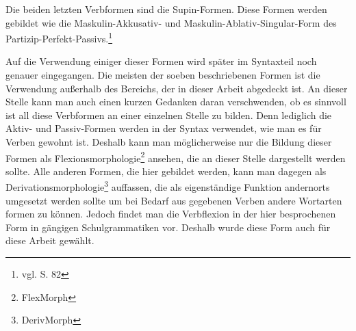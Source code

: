 \documentclass[fontsize=12pt,abstract=on,titlepage,bibliography=totoc,ngerman,listof=totoc]{scrreprt}
\begin{document}
Die beiden letzten Verbformen sind die Supin-Formen. Diese Formen werden gebildet wie die Maskulin-Akkusativ- und Maskulin-Ablativ-Singular-Form des Partizip-Perfekt-Passivs.\footnote{vgl. \cite{BAYER-LINDAUER1994} S. 82} \par
Auf die Verwendung einiger dieser Formen wird später im Syntaxteil noch genauer eingegangen. Die meisten der soeben beschriebenen Formen ist die Verwendung außerhalb des Bereichs, der in dieser Arbeit abgedeckt ist. An dieser Stelle kann man auch einen kurzen Gedanken daran verschwenden, ob es sinnvoll ist all diese Verbformen an einer einzelnen Stelle zu bilden. Denn lediglich die Aktiv- und Passiv-Formen werden in der Syntax verwendet, wie man es für Verben gewohnt ist. Deshalb kann man möglicherweise nur die Bildung dieser Formen als Flexionsmorphologie\footnote{FlexMorph} ansehen, die an dieser Stelle dargestellt werden sollte. Alle anderen Formen, die hier gebildet werden, kann man dagegen als Derivationsmorphologie\footnote{DerivMorph} auffassen, die als eigenständige Funktion andernorts umgesetzt werden sollte um bei Bedarf aus gegebenen Verben andere Wortarten formen zu können. Jedoch findet man die Verbflexion in der hier besprochenen Form in gängigen Schulgrammatiken vor. Deshalb wurde diese Form auch für diese Arbeit gewählt. %
\end{document}
